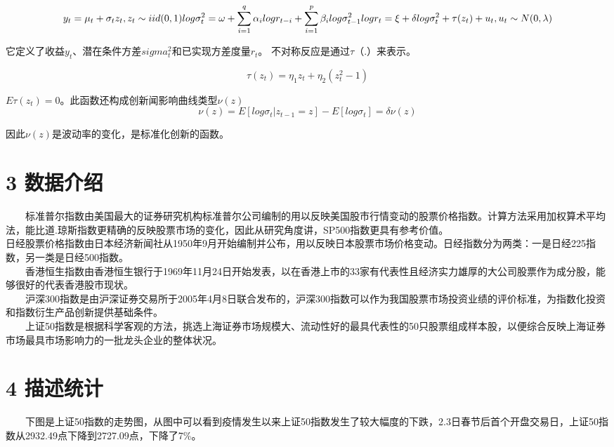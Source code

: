 \documentclass[
  11pt,
  letterpaper,
]{article}
\begin{document}
\[
y_t= \mu_t + \sigma_t z_t, z_t \sim iid(0,1)\\
log \sigma_t^2= \omega+ \sum_{i=1} ^ q \alpha_i log r_{t-i}+ \sum_{i=1} ^p \beta_i log \sigma_{t-1} ^2\\
log r_t= \xi + \delta log \sigma^2 _t + \tau (z_t)+ u_t, u_t \sim N(0, \lambda) 
\]

它定义了收益\(y_t\)、潜在条件方差\(sigma_t^2\)和已实现方差度量\(r_t\)。
不对称反应是通过\(\tau（.）\)来表示。

\[
\tau(z_t)= \eta_1 z_t+ \eta_2 (z_t^2 -1)
\]

\(E\tau(z_t)=0\)。此函数还构成创新闻影响曲线类型\(\nu(z)\) \[
\nu(z)= E[log \sigma_t | z_{t-1}=z] - E[log \sigma_t]= \delta \nu(z)
\]

因此\(\nu(z)\)是波动率的变化，是标准化创新的函数。

\hypertarget{ux6570ux636eux4ecbux7ecd}{%
\section{3 数据介绍}\label{ux6570ux636eux4ecbux7ecd}}

  标准普尔指数由美国最大的证券研究机构标准普尔公司编制的用以反映美国股市行情变动的股票价格指数。计算方法采用加权算术平均法，能比道.琼斯指数更精确的反映股票市场的变化，因此从研究角度讲，SP500指数更具有参考价值。\\
日经股票价格指数由日本经济新闻社从1950年9月开始编制并公布，用以反映日本股票市场价格变动。日经指数分为两类：一是日经225指数，另一类是日经500指数。\\
  香港恒生指数由香港恒生银行于1969年11月24日开始发表，以在香港上市的33家有代表性且经济实力雄厚的大公司股票作为成分股，能够很好的代表香港股市现状。\\
  沪深300指数是由沪深证券交易所于2005年4月8日联合发布的，沪深300指数可以作为我国股票市场投资业绩的评价标准，为指数化投资和指数衍生产品创新提供基础条件。\\
  上证50指数是根据科学客观的方法，挑选上海证券市场规模大、流动性好的最具代表性的50只股票组成样本股，以便综合反映上海证券市场最具市场影响力的一批龙头企业的整体状况。

\hypertarget{ux63cfux8ff0ux7edfux8ba1}{%
\section{4 描述统计}\label{ux63cfux8ff0ux7edfux8ba1}}

  下图是上证50指数的走势图，从图中可以看到疫情发生以来上证50指数发生了较大幅度的下跌，2.3日春节后首个开盘交易日，上证50指数从2932.49点下降到2727.09点，下降了7\%。
\end{document}
